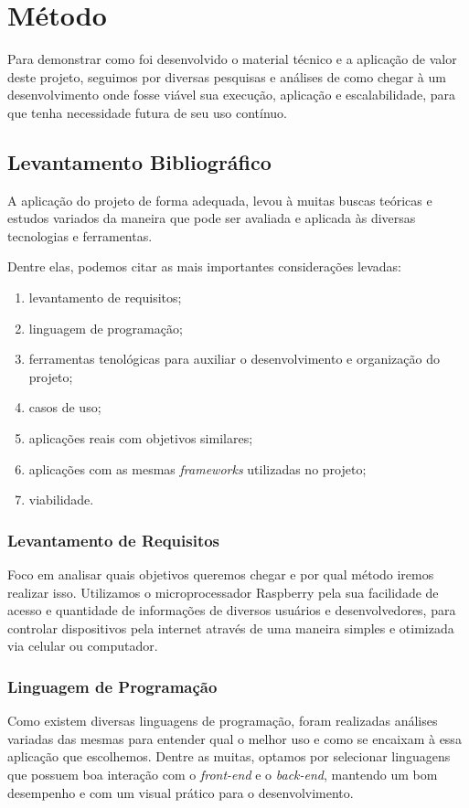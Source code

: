 \documentclass[../../layout.tex]{subfiles}
\begin{document}
\chapter{Método}
\hspace*{3em}Para demonstrar como foi desenvolvido o material técnico e a aplicação de valor deste projeto, seguimos por diversas pesquisas e análises de como chegar à um desenvolvimento onde fosse viável sua execução, aplicação e escalabilidade, para que tenha necessidade futura de seu uso contínuo.
\section{Levantamento Bibliográfico}
\hspace*{3em}A aplicação do projeto de forma adequada, levou à muitas buscas teóricas e estudos variados da maneira que pode ser avaliada e aplicada às diversas tecnologias e ferramentas. \par
Dentre elas, podemos citar as mais importantes considerações levadas:

\begin{enumerate}[label=\alph*)]
\itemsep0em
    \item levantamento de requisitos;
    \item linguagem de programação;
    \item ferramentas tenológicas para auxiliar o desenvolvimento e organização do projeto;
    \item casos de uso;
    \item aplicações reais com objetivos similares;
    \item aplicações com as mesmas \emph{frameworks} utilizadas no projeto;
    \item viabilidade.
\end{enumerate}

\subsection{Levantamento de Requisitos}
\hspace*{3em}Foco em analisar quais objetivos queremos chegar e por qual método iremos realizar isso. Utilizamos o microprocessador Raspberry pela sua facilidade de acesso e quantidade de informações de diversos usuários e desenvolvedores, para controlar dispositivos pela internet através de uma maneira simples e otimizada via celular ou computador.
\subsection{Linguagem de Programação}
\hspace*{3em}Como existem diversas linguagens de programação, foram realizadas análises variadas das mesmas para entender qual o melhor uso e como se encaixam à essa aplicação que escolhemos. Dentre as muitas, optamos por selecionar linguagens que possuem boa interação com o \emph{front-end} e o \emph{back-end}, mantendo um bom desempenho e com um visual prático para o desenvolvimento.
\end{document}
